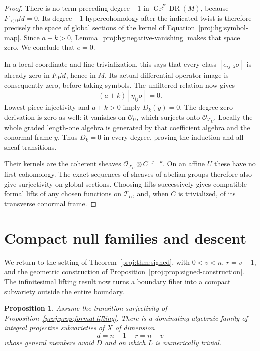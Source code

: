 \documentclass[11pt,letterpaper]{article}
\newcommand{\OO}{\mathcal{O}}
\DeclareMathOperator{\Gr}{Gr}
\DeclareMathOperator{\DR}{DR}
\newtheorem{proposition}[theorem]{Proposition}
\theoremstyle{definition}
\theoremstyle{remark}
\begin{document}
\begin{proof}
There is no term preceding degree \(-1\) in
\(\Gr^F_1\DR(M)\), because \(F_{<0}M=0\).  Its degree-\(-1\)
hypercohomology after the indicated twist is therefore precisely
the space of global sections of the kernel of
Equation~\eqref{proj:hg:symbol-map}.  Since \(a+k>0\),
Lemma~\ref{proj:hg:negative-vanishing} makes that space zero.
We conclude that \(e=0\).

In a local coordinate and line trivialization, this says that
every class \([e_{ij,\lambda}\sigma]\) is already zero in
\(F_0M\), hence in \(M\).  Its actual differential-operator image
is consequently zero, before taking symbols.  The unfiltered
relation now gives
\[
 (a+k)[\eta_{ij}\sigma]=0.
\]
Lowest-piece injectivity and \(a+k>0\) imply \(D_k(y)=0\).
The degree-zero derivation is zero as well: it vanishes on
\(\OO_U\), which surjects onto \(\OO_{\mathcal T_U}\).
Locally the whole graded length-one algebra is generated by
that coefficient algebra and the conormal frame \(y\).
Thus \(D_k=0\) in every degree, proving the induction and all
sheaf transitions.

Their kernels are the coherent sheaves
\(\OO_{\mathcal T_U}\otimes C^{-j-k}\).  On an affine \(U\)
these have no first cohomology.  The exact sequences of sheaves
of abelian groups therefore also give surjectivity on global
sections.  Choosing lifts successively gives compatible formal
lifts of any chosen functions on \(\mathcal T_U\), and, when
\(C\) is trivialized, of its transverse conormal frame.
\end{proof}

\section{Compact null families and descent}
\label{proj:sg:descent}

We return to the setting of Theorem~\ref{proj:thm:signed}, with
$0<v<n$, $r=v-1$, and the geometric construction of
Proposition~\ref{proj:prop:signed-construction}.  The infinitesimal
lifting result now turns a boundary fiber into a compact
subvariety outside the entire boundary.

\begin{proposition}\label{proj:prop:null-family}
Assume the transition surjectivity of
Proposition~\ref{proj:prop:formal-lifting}.  There is a dominating
algebraic family of integral projective subvarieties of $X$
of dimension
\[
 d=n-1-r=n-v
\]
whose general members avoid $D$ and on which $L$ is
numerically trivial.
\end{proposition}
\end{document}
